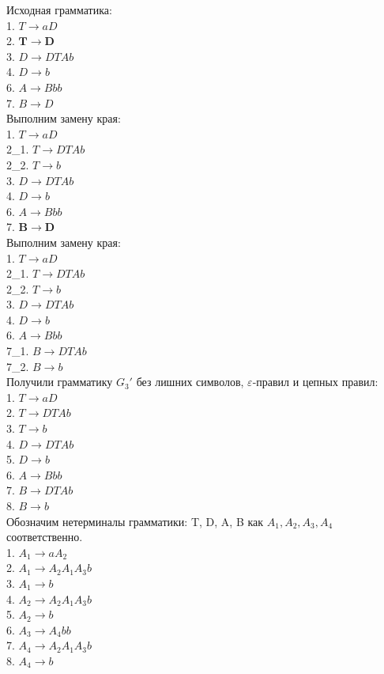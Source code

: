 \documentclass[a4paper,14pt]{extarticle}
\begin{document}
\begin{enumerate}[1.]
Исходная грамматика:\\
1. $T \rightarrow aD$\\
2. $\mathbf{T \rightarrow D}$\\
3. $D \rightarrow DTAb$\\
4. $D \rightarrow b$\\
6. $A \rightarrow Bbb$\\
7. $B \rightarrow D$\\

Выполним замену края:\\
1. $T \rightarrow aD$\\
2\_1. $T \rightarrow DTAb$\\
2\_2. $T \rightarrow b$\\
3. $D \rightarrow DTAb$\\
4. $D \rightarrow b$\\
6. $A \rightarrow Bbb$\\
7. $\mathbf{B \rightarrow D}$\\

Выполним замену края:\\
1. $T \rightarrow aD$\\
2\_1. $T \rightarrow DTAb$\\
2\_2. $T \rightarrow b$\\
3. $D \rightarrow DTAb$\\
4. $D \rightarrow b$\\
6. $A \rightarrow Bbb$\\
7\_1. $B \rightarrow DTAb$\\
7\_2. $B \rightarrow b$\\

Получили грамматику $G_3'$ без лишних символов, $\varepsilon$-правил и цепных правил:\\
1. $T \rightarrow aD$\\
2. $T \rightarrow DTAb$\\
3. $T \rightarrow b$\\
4. $D \rightarrow DTAb$\\
5. $D \rightarrow b$\\
6. $A \rightarrow Bbb$\\
7. $B \rightarrow DTAb$\\
8. $B \rightarrow b$\\

Обозначим нетерминалы грамматики: T, D, A, B как $A_1, A_2, A_3, A_4$ соответственно.\\
1. $A_1 \rightarrow aA_2$\\
2. $A_1 \rightarrow A_2A_1A_3b$\\
3. $A_1 \rightarrow b$\\
4. $A_2 \rightarrow A_2A_1A_3b$\\
5. $A_2 \rightarrow b$\\
6. $A_3 \rightarrow A_4bb$\\
7. $A_4 \rightarrow A_2A_1A_3b$\\
8. $A_4 \rightarrow b$\\


\end{enumerate}
\end{document}
